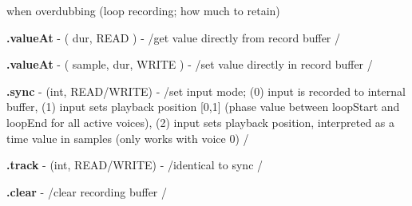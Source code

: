 {\begin{chuckitemize}
      when overdubbing (loop recording; how much to retain)
    \item {\bf .valueAt} - ( dur, READ ) - /get value directly from record buffer /
    \item {\bf .valueAt} - ( sample, dur, WRITE ) - /set value directly in
      record buffer /
    \item {\bf .sync} - (int, READ/WRITE) - /set input mode; (0) input is
      recorded to internal buffer, (1) input sets playback position
      [0,1] (phase value between loopStart and loopEnd for all active
      voices), (2) input sets playback position, interpreted as a time
      value in samples (only works with voice 0) /
    \item {\bf .track} - (int, READ/WRITE) - /identical to sync /
    \item {\bf .clear} - /clear recording buffer /
\end{chuckitemize}

}
